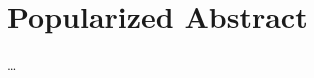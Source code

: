 \chapter{Popularized Abstract}\label{ch:popabstract}

\ldots

\instructionspopabstract


\cleardoublepage
